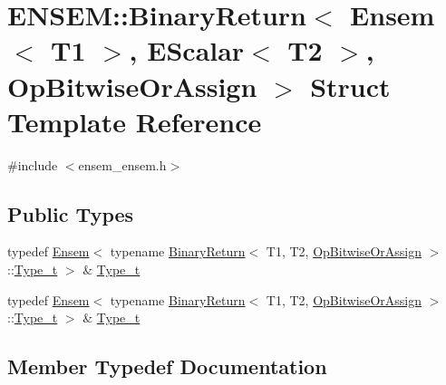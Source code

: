 \hypertarget{structENSEM_1_1BinaryReturn_3_01Ensem_3_01T1_01_4_00_01EScalar_3_01T2_01_4_00_01OpBitwiseOrAssign_01_4}{}\section{E\+N\+S\+EM\+:\+:Binary\+Return$<$ Ensem$<$ T1 $>$, E\+Scalar$<$ T2 $>$, Op\+Bitwise\+Or\+Assign $>$ Struct Template Reference}
\label{structENSEM_1_1BinaryReturn_3_01Ensem_3_01T1_01_4_00_01EScalar_3_01T2_01_4_00_01OpBitwiseOrAssign_01_4}


{\ttfamily \#include $<$ensem\+\_\+ensem.\+h$>$}

\subsection*{Public Types}
\begin{DoxyCompactItemize}
\item 
typedef \mbox{\hyperlink{classENSEM_1_1Ensem}{Ensem}}$<$ typename \mbox{\hyperlink{structENSEM_1_1BinaryReturn}{Binary\+Return}}$<$ T1, T2, \mbox{\hyperlink{structENSEM_1_1OpBitwiseOrAssign}{Op\+Bitwise\+Or\+Assign}} $>$\+::\mbox{\hyperlink{structENSEM_1_1BinaryReturn_3_01Ensem_3_01T1_01_4_00_01EScalar_3_01T2_01_4_00_01OpBitwiseOrAssign_01_4_a0b1c32ed629f70fa44b15f9278b7703f}{Type\+\_\+t}} $>$ \& \mbox{\hyperlink{structENSEM_1_1BinaryReturn_3_01Ensem_3_01T1_01_4_00_01EScalar_3_01T2_01_4_00_01OpBitwiseOrAssign_01_4_a0b1c32ed629f70fa44b15f9278b7703f}{Type\+\_\+t}}
\item 
typedef \mbox{\hyperlink{classENSEM_1_1Ensem}{Ensem}}$<$ typename \mbox{\hyperlink{structENSEM_1_1BinaryReturn}{Binary\+Return}}$<$ T1, T2, \mbox{\hyperlink{structENSEM_1_1OpBitwiseOrAssign}{Op\+Bitwise\+Or\+Assign}} $>$\+::\mbox{\hyperlink{structENSEM_1_1BinaryReturn_3_01Ensem_3_01T1_01_4_00_01EScalar_3_01T2_01_4_00_01OpBitwiseOrAssign_01_4_a0b1c32ed629f70fa44b15f9278b7703f}{Type\+\_\+t}} $>$ \& \mbox{\hyperlink{structENSEM_1_1BinaryReturn_3_01Ensem_3_01T1_01_4_00_01EScalar_3_01T2_01_4_00_01OpBitwiseOrAssign_01_4_a0b1c32ed629f70fa44b15f9278b7703f}{Type\+\_\+t}}
\end{DoxyCompactItemize}


\subsection{Member Typedef Documentation}
\mbox{\label{structENSEM_1_1BinaryReturn_3_01Ensem_3_01T1_01_4_00_01EScalar_3_01T2_01_4_00_01OpBitwiseOrAssign_01_4_a0b1c32ed629f70fa44b15f9278b7703f}} 

